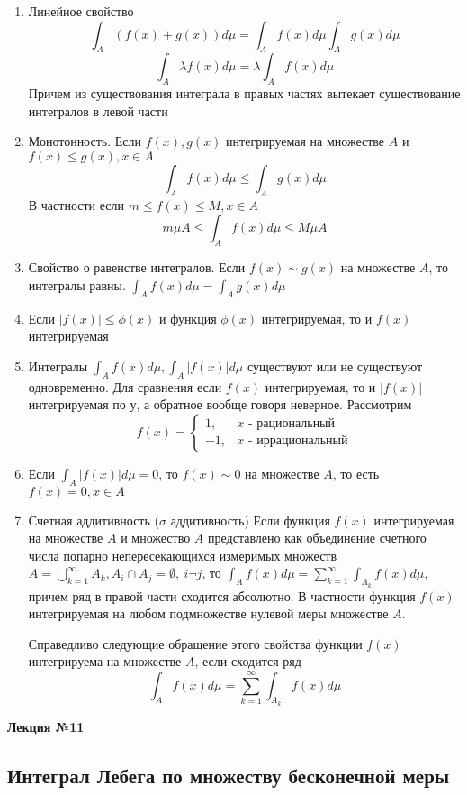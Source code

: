 \documentclass[14pt,a4paper]{extarticle}
\theoremstyle{definition}
\theoremstyle{remark}
\newcommand{\be}{\begin{enumerate}}
\newcommand{\ee}{\end{enumerate}}
\newcommand{\sep}{ , \ \allowbreak }
\renewcommand{\[}{\begin{dmath*}[compact]}
\renewcommand{\]}{\end{dmath*}}
\begin{document}
\be
  \item Линейное свойство
  \[\int_A (f(x)+g(x))d\mu=\int_A f(x)d\mu \int_A g(x)d\mu \]
  \[\int_A \lambda f(x) d\mu = \lambda \int_A f(x) d \mu\]
  Причем из существования интеграла в правых частях вытекает существование интегралов в левой части
  \item Монотонность. Если $f(x), g(x)$ интегрируемая на множестве $A$ и $f(x)\leq g(x), x\in A$
  \[\int_A f(x) d\mu \leq \int_A g(x) d\mu\]
  В частности если  $m\leq f(x) \leq M, x \in A$
  \[ m\mu A\leq \int_A f(x) d \mu \leq M\mu A \]
  \item Свойство о равенстве интегралов.
  Если $f(x) \sim g(x)$ на множестве $A$, то интегралы равны. $\int_A f(x)d\mu = \int_A g(x) d\mu$
  \item Если $|f(x)|\leq \phi(x)$ и функция $\phi(x)$ интегрируемая, то и $f(x)$ интегрируемая
  \item Интегралы $\int_A f(x) d\mu, \int_A |f(x)| d\mu$ существуют или не существуют одновременно. Для сравнения если $f(x)$ интегрируемая, то и $|f(x)|$ интегрируемая по у, а обратное вообще говоря неверное. Рассмотрим
  \[f(x) = \begin{cases} 1, & x\text{ - рациональный} \\ -1, & x\text{ - иррациональный} \end{cases}\]
  \item Если $\int_A |f(x)| d\mu = 0$, то $f(x)\sim 0$ на множестве $A$, то есть $f(x) = 0, x \in A$
  \item Счетная аддитивность ($\sigma$ аддитивность)
  Если функция $f(x)$ интегрируемая на множестве $A$ и множество $A$ представлено как объединение счетного числа попарно непересекающихся измеримых множеств $A= \bigcup_{k=1}^\infty A_k, A_i \cap A_j=\emptyset \sep i \neg j$, то $\int_A f(x)d\mu = \sum_{k=1}^\infty \int_{A_k} f(x) d \mu$, причем ряд в правой части сходится абсолютно. В частности функция $f(x)$ интегрируемая на любом подмножестве нулевой меры множестве $A$.

  Справедливо следующие обращение этого свойства функции $f(x)$ интегрируема на множестве $A$, если сходится ряд
  \[\int_A f(x) d \mu =\sum_{k=1}^\infty \int_{A_k} f(x) d \mu\]
\ee

\textbf{Лекция №11}

\subsection{Интеграл Лебега по множеству бесконечной меры}
\end{document}
